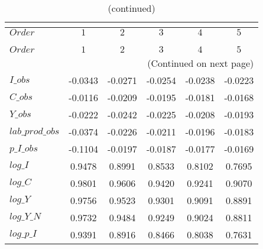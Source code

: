  
\begin{center}
\begin{longtable}{lccccc} 
\caption{COEFFICIENTS OF AUTOCORRELATION}\\
 \label{Table:th_autocorr_matrix}\\
\toprule 
$Order           $	 & 	 $          1$	 & 	 $          2$	 & 	 $          3$	 & 	 $          4$	 & 	 $          5$\\
\midrule \endfirsthead 
\caption{(continued)}\\
 \toprule \\ 
$Order           $	 & 	 $          1$	 & 	 $          2$	 & 	 $          3$	 & 	 $          4$	 & 	 $          5$\\
\midrule \endhead 
\midrule \multicolumn{6}{r}{(Continued on next page)} \\ \bottomrule \endfoot 
\bottomrule \endlastfoot 
$I\_obs          $	 & 	    -0.0343	 & 	    -0.0271	 & 	    -0.0254	 & 	    -0.0238	 & 	    -0.0223 \\ 
$C\_obs          $	 & 	    -0.0116	 & 	    -0.0209	 & 	    -0.0195	 & 	    -0.0181	 & 	    -0.0168 \\ 
$Y\_obs          $	 & 	    -0.0222	 & 	    -0.0242	 & 	    -0.0225	 & 	    -0.0208	 & 	    -0.0193 \\ 
$lab\_prod\_obs  $	 & 	    -0.0374	 & 	    -0.0226	 & 	    -0.0211	 & 	    -0.0196	 & 	    -0.0183 \\ 
$p\_I\_obs       $	 & 	    -0.1104	 & 	    -0.0197	 & 	    -0.0187	 & 	    -0.0177	 & 	    -0.0169 \\ 
$log\_I          $	 & 	     0.9478	 & 	     0.8991	 & 	     0.8533	 & 	     0.8102	 & 	     0.7695 \\ 
$log\_C          $	 & 	     0.9801	 & 	     0.9606	 & 	     0.9420	 & 	     0.9241	 & 	     0.9070 \\ 
$log\_Y          $	 & 	     0.9756	 & 	     0.9523	 & 	     0.9301	 & 	     0.9091	 & 	     0.8891 \\ 
$log\_Y\_N       $	 & 	     0.9732	 & 	     0.9484	 & 	     0.9249	 & 	     0.9024	 & 	     0.8811 \\ 
$log\_p\_I       $	 & 	     0.9391	 & 	     0.8916	 & 	     0.8466	 & 	     0.8038	 & 	     0.7631 \\ 
\end{longtable}
 \end{center}
